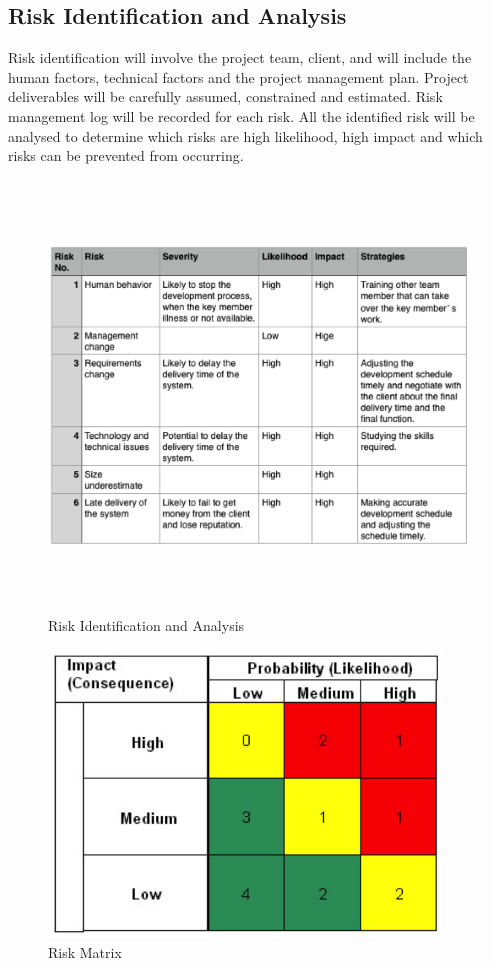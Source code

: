 \documentclass[11pt, a4paper]{article}
\begin{document}
\subsection{Risk Identification and Analysis}
Risk identification will involve the project team, client, and will include the human factors, technical factors and the project management plan. Project deliverables will be carefully assumed, constrained and estimated. Risk management log will be recorded for each risk. All the identified risk will be analysed to determine which risks are high likelihood, high impact and which risks can be prevented from occurring.

\begin{figure}[H]
\centering
\includegraphics[height=4.5in]{RIA.png}
\caption[Risk Identification and Analysis]{Risk Identification and Analysis}
\end{figure}

\begin{figure}[H]
\centering
\includegraphics[height=3in]{RM.png}
\caption[Risk Matrix]{Risk Matrix}
\end{figure}
\end{document}
